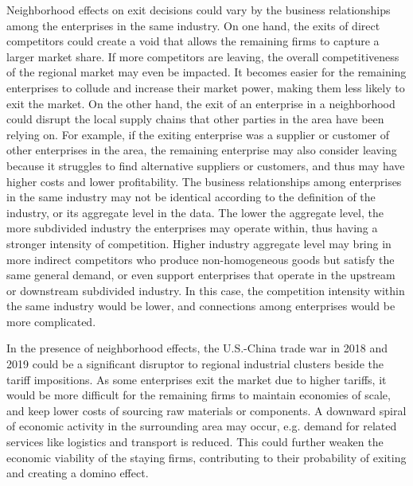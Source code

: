 Neighborhood effects on exit decisions could vary by the business relationships among the enterprises in the same industry. On one hand, the exits of direct competitors could create a void that allows the remaining firms to capture a larger market share. If more competitors are leaving, the overall competitiveness of the regional market may even be impacted. It becomes easier for the remaining enterprises to collude and increase their market power, making them less likely to exit the market. On the other hand, the exit of an enterprise in a neighborhood could disrupt the local supply chains that other parties in the area have been relying on. For example, if the exiting enterprise was a supplier or customer of other enterprises in the area, the remaining enterprise may also consider leaving because it struggles to find alternative suppliers or customers, and thus may have higher costs and lower profitability. The business relationships among enterprises in the same industry may not be identical according to the definition of the industry, or its aggregate level in the data. The lower the aggregate level, the more subdivided industry the enterprises may operate within, thus having a stronger intensity of competition. Higher industry aggregate level may bring in more indirect competitors who produce non-homogeneous goods but satisfy the same general demand, or even support enterprises that operate in the upstream or downstream subdivided industry. In this case, the competition intensity within the same industry would be lower, and connections among enterprises would be more complicated.

In the presence of neighborhood effects, the U.S.-China trade war in 2018 and 2019 could be a significant disruptor to regional industrial clusters beside the tariff impositions. As some enterprises exit the market due to higher tariffs, it would be more difficult for the remaining firms to maintain economies of scale, and keep lower costs of sourcing raw materials or components. A downward spiral of economic activity in the surrounding area may occur, e.g. demand for related services like logistics and transport is reduced. This could further weaken the economic viability of the staying firms, contributing to their probability of exiting and creating a domino effect.

